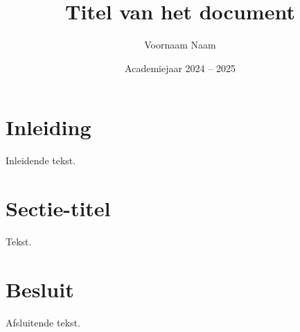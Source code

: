 \documentclass[kulak]{kulakarticle} %
\title{Titel van het document}
\author{Voornaam Naam}
\date{Academiejaar 2024 -- 2025}
\begin{document}
\maketitle

\section*{Inleiding}

Inleidende tekst.

\section{Sectie-titel}

Tekst.

\section*{Besluit}

Afsluitende tekst.
\end{document}
